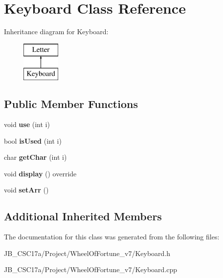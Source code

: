 \hypertarget{class_keyboard}{}\section{Keyboard Class Reference}
\label{class_keyboard}
Inheritance diagram for Keyboard\+:\begin{figure}[H]
\begin{center}
\leavevmode
\includegraphics[height=2.000000cm]{class_keyboard}
\end{center}
\end{figure}
\subsection*{Public Member Functions}
\begin{DoxyCompactItemize}
\item 
\hypertarget{class_keyboard_ab709f4e952b99660d72624f0493016e4}{}\label{class_keyboard_ab709f4e952b99660d72624f0493016e4} 
void {\bfseries use} (int i)
\item 
\hypertarget{class_keyboard_a1857f3cb6f908638aa6296285fc15e9e}{}\label{class_keyboard_a1857f3cb6f908638aa6296285fc15e9e} 
bool {\bfseries is\+Used} (int i)
\item 
\hypertarget{class_keyboard_a4d7628f0662938e4f41cd49acc659224}{}\label{class_keyboard_a4d7628f0662938e4f41cd49acc659224} 
char {\bfseries get\+Char} (int i)
\item 
\hypertarget{class_keyboard_aed02d9f56fb12f4cec1129de092913d1}{}\label{class_keyboard_aed02d9f56fb12f4cec1129de092913d1} 
void {\bfseries display} () override
\item 
\hypertarget{class_keyboard_a5b4f3bd7c70e78197c806d1d81f499fe}{}\label{class_keyboard_a5b4f3bd7c70e78197c806d1d81f499fe} 
void {\bfseries set\+Arr} ()
\end{DoxyCompactItemize}
\subsection*{Additional Inherited Members}


The documentation for this class was generated from the following files\+:\begin{DoxyCompactItemize}
\item 
J\+B\+\_\+\+C\+S\+C17a/\+Project/\+Wheel\+Of\+Fortune\+\_\+v7/Keyboard.\+h\item 
J\+B\+\_\+\+C\+S\+C17a/\+Project/\+Wheel\+Of\+Fortune\+\_\+v7/Keyboard.\+cpp\end{DoxyCompactItemize}
